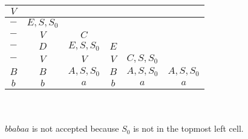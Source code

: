 \documentclass[solution, letterpaper]{cs121}
\begin{document}
\begin{solution}
\begin{tabular}{|c|c|c|c|c|c|}\hline
$V$			&			&			&			&			&\\\hline
$-$			&$E,S,S_0$	&			&			&			&\\\hline
$-$			&$V$		&$C$		&			&			&\\\hline
$-$			&$D$		&$E,S,S_0$	&$E$		&			&\\\hline
$-$			&$V$		&$V$		&$V$		&$C,S,S_0$	&\\\hline
$B$			&$B$		&$A,S,S_0$	&$B$		&$A,S,S_0$	&$A,S,S_0$\\\hline
$b$			&$b$			&$a$			&$b$			&$a$			&$a$\\\hline
\end{tabular}
\\\\$bbabaa$ is not accepted because $S_0$ is not in the topmost left cell.
\end{solution}
\end{document}
